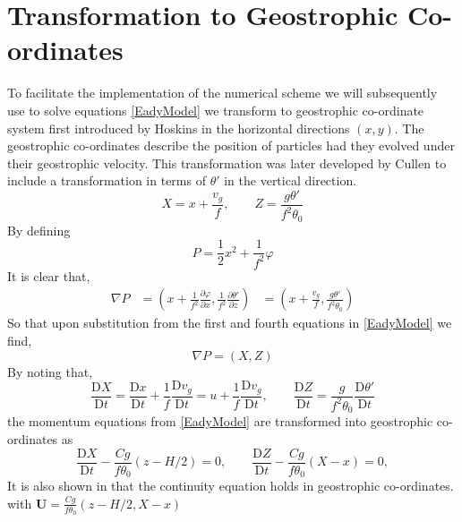 \section{Transformation to Geostrophic Co-ordinates \label{transformation}}
To facilitate the implementation of the numerical scheme we will subsequently use to solve equations \ref{EadyModel} we transform to geostrophic co-ordinate system first introduced by Hoskins \cite{Hoskins1975} in the horizontal directions $(x,y)$. The geostrophic co-ordinates describe the position of particles had they evolved under their geostrophic velocity. This transformation was later developed by Cullen \cite{Cullen2006a} to include a transformation in terms of $\theta '$ in the vertical direction.
\begin{equation}
X = x + \frac{v_g}{f}, \qquad Z = \frac{g\theta'}{f^2\theta_0}
\end{equation}
By defining
\begin{equation}
P = \frac{1}{2}x^2 + \frac{1}{f^2}\varphi
\label{P}
\end{equation}
It is clear that,
\begin{equation*}
\begin{aligned}
\nabla P &= \left(x + \frac{1}{f^2}\frac{\partial \varphi}{\partial x}, \frac{1}{f^2} \frac{\partial \theta'}{\partial z}\right)
&= \left(x + \frac{v_g}{f}, \frac{g\theta'}{f^2\theta_0}\right)
\end{aligned}
\end{equation*}
So that upon substitution from the first and fourth equations in \ref{EadyModel} we find,
\begin{equation}
\nabla P = (X,Z)
\label{gradP}
\end{equation}
By noting that,
\begin{equation*}
\frac{\mathrm{D}X}{\mathrm{D}t} = \frac{\mathrm{D}x}{\mathrm{D}t} + \frac{1}{f}\frac{\mathrm{D}v_g}{\mathrm{D}t} = u + \frac{1}{f}\frac{\mathrm{D}v_g}{\mathrm{D}t}, \qquad \frac{\mathrm{D}Z}{\mathrm{D}t} = \frac{g}{f^2\theta_0} \frac{\mathrm{D}\theta '}{\mathrm{D}t}
\end{equation*}
the momentum equations from \ref{EadyModel} are transformed into geostrophic co-ordinates as
\begin{equation}
\frac{\mathrm{D}X}{\mathrm{D}t} -\frac{Cg}{f\theta _0}\left(z-H/2\right) = 0,\qquad
\frac{\mathrm{D}Z}{\mathrm{D}t} - \frac{Cg}{f\theta_0}\left(X - x\right) = 0,
\label{Gmom}
\end{equation}
It is also shown in \cite{Cullen2006a} that the continuity equation holds in geostrophic co-ordinates. with $\bm{U} = \frac{Cg}{f\theta _0}\left(z-H/2, X-x\right) $
